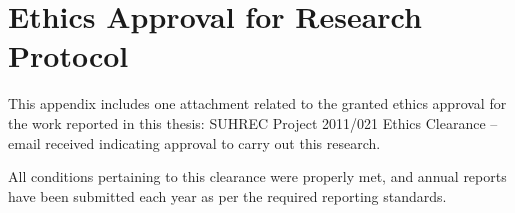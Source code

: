 
\chapter{Ethics Approval for Research Protocol} %
\label{cha:ethics_protocol}


This appendix includes one attachment related to the granted ethics approval for the work reported in this thesis: SUHREC Project 2011/021 Ethics Clearance -- email received indicating approval to carry out this research.


All conditions pertaining to this clearance were properly met, and annual reports have been submitted each year as per the required reporting standards.

\graphicspath{{Figures/Appendix/}}

% 


